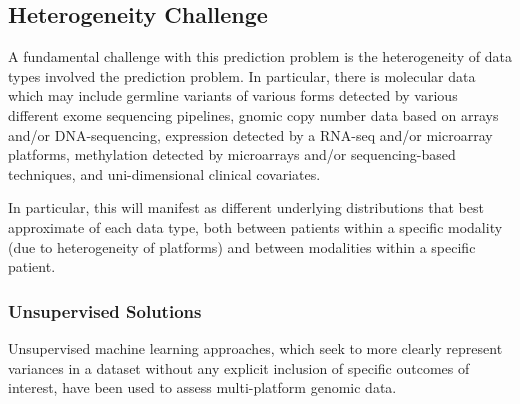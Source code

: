 \subsection{Heterogeneity Challenge}

A fundamental challenge with this prediction problem is the heterogeneity of data types involved the prediction problem. In particular, there is molecular data which may include germline variants of various forms detected by various different exome sequencing pipelines, gnomic copy number data based on arrays and/or DNA-sequencing, expression detected by a RNA-seq and/or microarray platforms, methylation detected by microarrays and/or sequencing-based techniques, and uni-dimensional clinical covariates. 


In particular, this will manifest as different underlying distributions that best approximate of each data type, both between patients within a specific modality (due to heterogeneity of platforms) and between modalities within a specific patient.


\subsubsection{Unsupervised Solutions}

Unsupervised machine learning approaches, which seek to more clearly represent variances in a dataset without any explicit inclusion of specific outcomes of interest, have been used to assess multi-platform genomic data.

